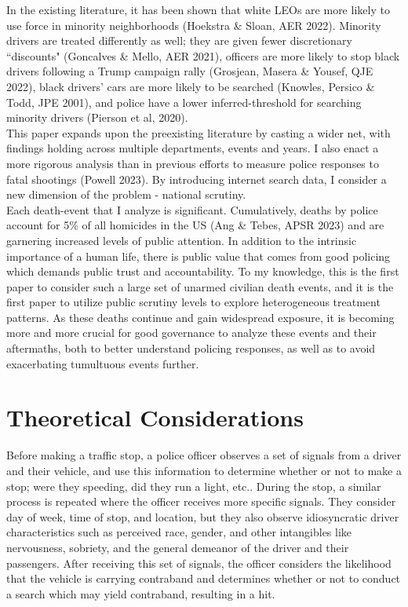 In the existing literature, it has been shown that white LEOs are more likely to use force in minority neighborhoods (Hoekstra \& Sloan, AER 2022). Minority drivers are treated differently as well; they are given fewer discretionary ``discounts" (Goncalves \& Mello, AER 2021), officers are more likely to stop black drivers following a Trump campaign rally (Grosjean, Masera \& Yousef, QJE 2022), black drivers' cars are more likely to be searched (Knowles, Persico \& Todd, JPE 2001), and police have a lower inferred-threshold for searching minority drivers (Pierson et al, 2020). \\

This paper expands upon the preexisting literature by casting a wider net, with findings holding across multiple departments, events and years. I also enact a more rigorous analysis than in previous efforts to measure police responses to fatal shootings (Powell 2023). By introducing internet search data, I consider a new dimension of the problem - national scrutiny.  \\

Each death-event that I analyze is significant. Cumulatively, deaths by police account for 5\% of all homicides in the US (Ang \& Tebes, APSR 2023) and are garnering increased levels of public attention. In addition to the intrinsic importance of a human life, there is public value that comes from good policing which demands public trust and accountability. To my knowledge, this is the first paper to consider such a large set of unarmed civilian death events, and it is the first paper to utilize public scrutiny levels to explore heterogeneous treatment patterns. As these deaths continue and gain widespread exposure, it is becoming more and more crucial for good governance to analyze these events and their aftermaths, both to better understand policing responses, as well as to avoid exacerbating tumultuous events further. 

\section{Theoretical Considerations} 
Before making a traffic stop, a police officer observes a set of signals from a driver and their vehicle, and use this information to determine whether or not to make a stop; were they speeding, did they run a light, etc.. During the stop, a similar process is repeated where the officer receives more specific signals. They consider day of week, time of stop, and location, but they also observe idiosyncratic driver characteristics such as perceived race, gender, and other intangibles like nervousness, sobriety, and the general demeanor of the driver and their passengers. After receiving this set of signals, the officer considers the likelihood that the vehicle is carrying contraband and determines whether or not to conduct a search which may yield contraband, resulting in a hit. \\

